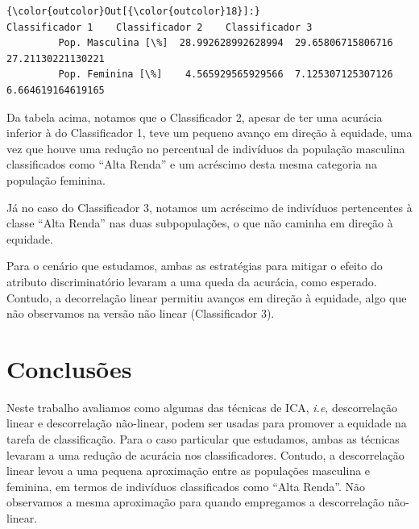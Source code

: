 \documentclass[11pt]{article}
\begin{document}
\begin{Verbatim}[commandchars=\\\{\}]
{\color{outcolor}Out[{\color{outcolor}18}]:}                        Classificador 1    Classificador 2    Classificador 3
         Pop. Masculina [\%]  28.992628992628994  29.65806715806716  27.21130221130221
         Pop. Feminina [\%]    4.565929565929566  7.125307125307126  6.664619164619165
\end{Verbatim}
            
    Da tabela acima, notamos que o Classificador 2, apesar de ter uma
acurácia inferior à do Classificador 1, teve um pequeno avanço em
direção à equidade, uma vez que houve uma redução no percentual de
indivíduos da população masculina classificados como ``Alta Renda'' e um
acréscimo desta mesma categoria na população feminina.

Já no caso do Classificador 3, notamos um acréscimo de indivíduos
pertencentes à classe ``Alta Renda'' nas duas subpopulações, o que não
caminha em direção à equidade.

Para o cenário que estudamos, ambas as estratégias para mitigar o efeito
do atributo discriminatório levaram a uma queda da acurácia, como
esperado. Contudo, a decorrelação linear permitiu avanços em direção à
equidade, algo que não observamos na versão não linear (Classificador
3).

    \hypertarget{conclusuxf5es}{%
\section{Conclusões}\label{conclusuxf5es}}

Neste trabalho avaliamos como algumas das técnicas de ICA, \emph{i.e},
descorrelação linear e descorrelação não-linear, podem ser usadas para
promover a equidade na tarefa de classificação. Para o caso particular
que estudamos, ambas as técnicas levaram a uma redução de acurácia nos
classificadores. Contudo, a descorrelação linear levou a uma pequena
aproximação entre as populações masculina e feminina, em termos de
indivíduos classificados como ``Alta Renda''. Não observamos a mesma
aproximação para quando empregamos a descorrelação não-linear.


    
    



    
    
\end{document}
